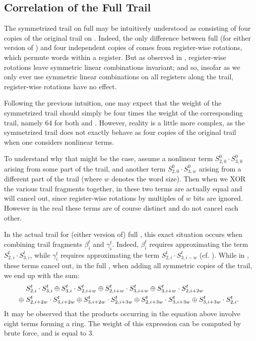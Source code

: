 \subsection{Correlation of the Full Trail}

The symmetrized trail on full \MORUS may be intuitively understood as consisting of four copies of the original trail on \MiniMORUS. Indeed, the only difference between full \MORUS (for either version of \MORUS) and four independent copies of \MiniMORUS comes from register-wise rotations, which permute words within a register. But as observed in , register-wise rotations leave symmetric linear combinations invariant; and so, insofar as we only ever use symmetric linear combinations on all registers along the trail, register-wise rotations have no effect.

Following the previous intuition, one may expect that the weight of the symmetrized trail should simply be four times the weight of the corresponding \MiniMORUS trail, namely 64 for both \MORUS[1280] and \MORUS[640]. However, reality is a little more complex, as the symmetrized trail does not exactly behave as four copies of the original trail when one considers nonlinear terms.

To understand why that might be the case, assume a nonlinear term $S^0_{2,0} \cdot S^0_{3,0}$ arising from some part of the trail, and another term $S^0_{2,0} \cdot S^0_{3,w}$ arising from a different part of the trail (where $w$ denotes the word size). Then when we XOR the various trail fragments together, in \MiniMORUS these two terms are actually equal and will cancel out, since register-wise rotations by multiples of $w$ bits are ignored. However in the real \MORUS these terms are of course distinct and do not cancel each other.

In the actual trail for (either version of) full \MORUS, this exact situation occurs when combining trail fragments $\beta^t_i$ and $\gamma^t_i$. Indeed, $\beta^t_i$ requires approximating the term $S^t_{2,i} \cdot S^t_{3,i}$, while $\gamma^t_i$ requires approximating the term $S^t_{2,i} \cdot S^t_{3,i-w}$ (cf. ). While in \MiniMORUS, these terms cancel out, in the full \MORUS, when adding all symmetric copies of the trail, we end up with the sum:
\begin{align}
&S^t_{2,i} \cdot S^t_{3,i} \oplus S^t_{3,i} \cdot S^t_{2,i+w}
\oplus S^t_{2,i+w} \cdot S^t_{3,i+w} \oplus S^t_{3,i+w} \cdot S^t_{2,i+2w}\notag\\
\oplus\; &S^t_{2,i+2w} \cdot S^t_{3,i+2w} \oplus S^t_{3,i+2w} \cdot S^t_{2,i+3w}
\oplus S^t_{2,i+3w} \cdot S^t_{3,i+3w} \oplus S^t_{3,i+3w} \cdot S^t_{2,i}.\label{eq:8circle}
\end{align}
It may be observed that the products occurring in the equation above involve eight terms forming a ring. The weight of this expression can be computed by brute force, and is equal to $3$.

